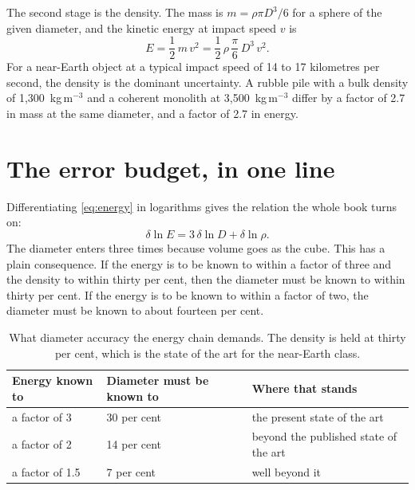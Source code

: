 The second stage is the density. The mass is \(m = \rho \pi D^{3}/6\) for a
sphere of the given diameter, and the kinetic energy at impact speed \(v\) is
\begin{equation}
E = \frac{1}{2}\,m\,v^{2} = \frac{1}{2}\,\rho\,\frac{\pi}{6}\,D^{3}\,v^{2}.
\label{eq:energy}
\end{equation}
For a near-Earth object at a typical impact speed of 14 to 17 kilometres per
second, the density is the dominant uncertainty. A rubble pile with a bulk
density of 1,300~kg\,m\(^{-3}\) and a coherent monolith at 3,500~kg\,m\(^{-3}\)
differ by a factor of 2.7 in mass at the same diameter, and a factor of 2.7 in
energy.

\section{The error budget, in one line}

Differentiating \eqref{eq:energy} in logarithms gives the relation the whole
book turns on:
\begin{equation}
\delta\ln E = 3\,\delta\ln D + \delta\ln \rho.
\label{eq:dlne}
\end{equation}
The diameter enters three times because volume goes as the cube. This has a
plain consequence. If the energy is to be known to within a factor of three
and the density to within thirty per cent, then the diameter must be known to
within thirty per cent. If the energy is to be known to within a factor of
two, the diameter must be known to about fourteen per cent.

\begin{table}[!htbp]
\centering
\small
\caption{What diameter accuracy the energy chain demands. The density is held
at thirty per cent, which is the state of the art for the near-Earth class.}
\label{tab:diameter-need}
\begin{tabularx}{\textwidth}{@{}P{1.19in}P{1.37in}Y@{}}
\toprule
{}
\textbf{Energy known to} & \textbf{Diameter must be known to} &
\textbf{Where that stands} \\
\midrule
a factor of 3 & 30 per cent & the present state of the art \\
a factor of 2 & 14 per cent & beyond the published state of the art \\
a factor of 1.5 & 7 per cent & well beyond it \\
\bottomrule
\end{tabularx}
\end{table}

